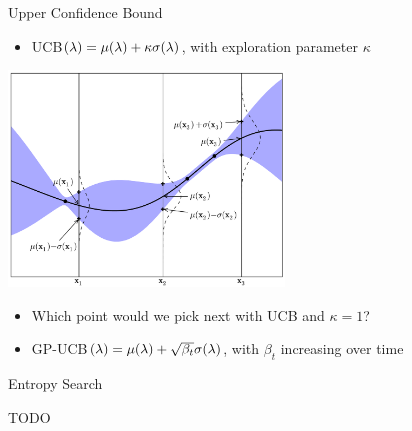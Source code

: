 \begin{frame}[c,fragile]{Upper Confidence Bound}
\begin{itemize}
\vspace*{-0.2cm}
  \item UCB$(\mathbf{\lambda}) = \mu(\mathbf{\lambda}) + \kappa\sigma(\mathbf{\lambda})$, with exploration parameter $\kappa$
\end{itemize}
\vspace*{-0.2cm}  
\centering
\includegraphics[width=0.55\textwidth]{images/Acquisition-UCB.png} 
\vspace*{0.2cm}  
\begin{itemize}
\item Which point would we pick next with UCB and $\kappa = 1$? \hands
\pause
 \item GP-UCB$(\mathbf{\lambda}) = \mu(\mathbf{\lambda}) + \sqrt{\beta_t} \sigma(\mathbf{\lambda})$, with $\beta_t$ \alert{increasing} over time\\
\end{itemize}

\end{frame}
\begin{frame}[c,fragile]{Entropy Search}

TODO

\end{frame}

